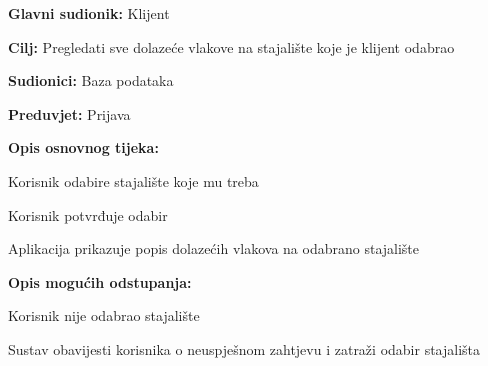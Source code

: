 					\noindent {}
					\begin{packed_item}
	
						\item \textbf{Glavni sudionik: } Klijent
						\item  \textbf{Cilj:} Pregledati sve dolazeće vlakove na stajalište koje je klijent odabrao
						\item  \textbf{Sudionici:} Baza podataka
						\item  \textbf{Preduvjet:} Prijava
						\item  \textbf{Opis osnovnog tijeka:}
						
						\item[] \begin{packed_enum}
	
							\item Korisnik odabire stajalište koje mu treba
							\item Korisnik potvrđuje odabir
							\item Aplikacija prikazuje popis dolazećih vlakova na odabrano stajalište
							
						\end{packed_enum}
						
						\item  \textbf{Opis mogućih odstupanja:}
						
						\item[] \begin{packed_item}
	
							\item[2.a] Korisnik nije odabrao stajalište
							\item[] \begin{packed_enum}
								
								\item Sustav obavijesti korisnika o neuspješnom zahtjevu i zatraži odabir stajališta
								
							\end{packed_enum}
							
						\end{packed_item}
					\end{packed_item}
					
